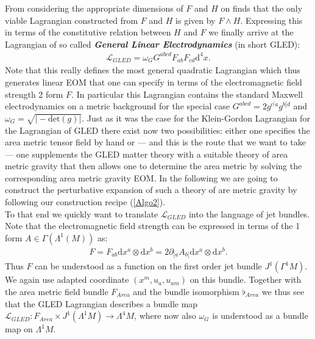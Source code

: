 \documentclass[a4paper,12pt, DIV=14, BCOR=5mm, twoside, headsepline]{scrbook}
\begin{document}
From considering the appropriate dimensions of $F$ and $H$ on finds that the only viable Lagrangian constructed from $F$ and $H$ is given by $F \wedge H$. Expressing this in terms of the constitutive relation between $H$ and $F$ we finally arrive at the Lagrangian of so called \textbf{\textit{General Linear Electrodynamics}} (in short GLED):
\begin{align}
    \mathcal{L}_{GLED} = \omega_G G^{abcd}F_{ab}F_{cd}\mathrm{d}^4x.
\end{align}
Note that this really defines the most general quadratic Lagrangian which thus generates linear EOM that one can specify in terms of the  electromagnetic field strength 2 form $F$. In particular this Lagrangian contains the standard Maxwell electrodynamics on a metric background for the special case $G^{abcd} = 2 g^{c^[a}g^{b]d}$ and $\omega_{G}=\sqrt{\vert -\mathrm{det}(g) \vert}$. Just as it was the case for the Klein-Gordon Lagrangian for the Lagrangian of GLED there exist now two possibilities: either one specifies the area metric tensor field by hand or --- and this is the route that we want to take --- one supplements the GLED matter theory with a suitable theory of area metric gravity that then allows one to determine the area metric by solving the corresponding area metric gravity EOM. 
In the following we are going to construct the perturbative expansion of such a theory of are metric gravity by following our construction recipe (\ref{Algo2}).\\

To that end we quickly want to translate $\mathcal{L}_{GLED}$ into the language of jet bundles. Note that the electromagnetic field strength can be expressed in terms of the 1 form $A \in \Gamma(\Lambda^1(M))$ as:
\begin{align}
F = F_{ab} \mathrm{d}x^a \otimes \mathrm{d}x^b = 2 \partial_{[a} A_{b]}\mathrm{d}x^a \otimes \mathrm{d}x^b.
\end{align}
Thus $F$ can be understood as a function on the first order jet bundle $J^1(\Gamma^1M)$. We again use adapted coordinate $(x^m,u_a,u_{am})$ on this bundle. Together with the area metric field bundle $F_{Area}$ and the bundle isomorphism $\flat_{Area}$ we thus see that the GLED Lagrangian describes a bundle map $\mathcal{L}_{GLED} : F_{Area} \times J^1(\Lambda^1M) \rightarrow \Lambda^4M $, where now also $\omega_G$ is understood as a bundle map on $\Lambda^1M$.  
\end{document}
